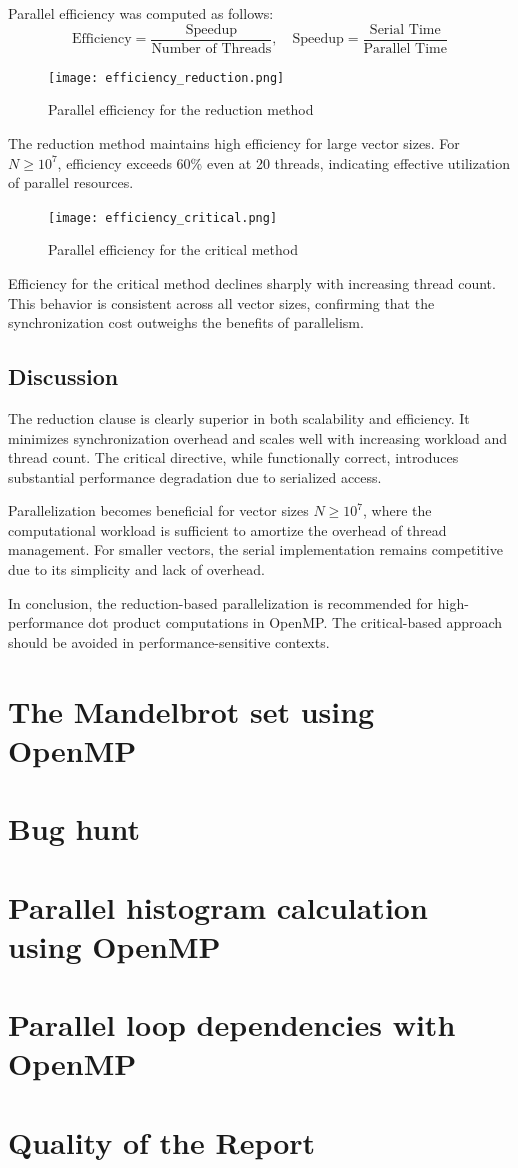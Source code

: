 \documentclass[unicode,11pt,a4paper,oneside,numbers=endperiod,openany]{scrartcl}
\begin{document}
Parallel efficiency was computed as follows:
\[
\text{Efficiency} = \frac{\text{Speedup}}{\text{Number of Threads}}, \quad \text{Speedup} = \frac{\text{Serial Time}}{\text{Parallel Time}}
\]

\begin{figure}[h]
  \centering
  \texttt{[image: efficiency\_reduction.png]}
  \caption{Parallel efficiency for the reduction method}
\end{figure}

The reduction method maintains high efficiency for large vector sizes. For $N \geq 10^7$, efficiency exceeds 60\% even at 20 threads, indicating effective utilization of parallel resources.

\begin{figure}[h]
  \centering
  \texttt{[image: efficiency\_critical.png]}
  \caption{Parallel efficiency for the critical method}
\end{figure}

Efficiency for the critical method declines sharply with increasing thread count. This behavior is consistent across all vector sizes, confirming that the synchronization cost outweighs the benefits of parallelism.

\subsection*{Discussion}

The reduction clause is clearly superior in both scalability and efficiency. It minimizes synchronization overhead and scales well with increasing workload and thread count. The critical directive, while functionally correct, introduces substantial performance degradation due to serialized access.

Parallelization becomes beneficial for vector sizes $N \geq 10^7$, where the computational workload is sufficient to amortize the overhead of thread management. For smaller vectors, the serial implementation remains competitive due to its simplicity and lack of overhead.

In conclusion, the reduction-based parallelization is recommended for high-performance dot product computations in OpenMP. The critical-based approach should be avoided in performance-sensitive contexts.

\section{The Mandelbrot set using OpenMP }

\section{Bug hunt }

\section{Parallel histogram calculation using OpenMP }

\section{Parallel loop dependencies with OpenMP }

\section{Quality of the Report }
\end{document}
